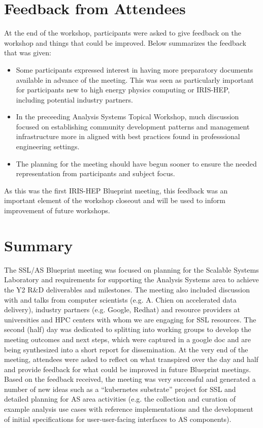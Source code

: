 \documentclass[11pt,letterpaper,fleqn]{article}
\begin{document}
\section{Feedback from Attendees}
\vspace{0.2cm}
At the end of the workshop, participants were asked to give feedback on the workshop and things that could be improved. Below summarizes the feedback that was given:
\begin{itemize}
  \item Some participants expressed interest in having more preparatory documents available in advance of the meeting.  This was seen as particularly important for participants new to high energy physics computing or IRIS-HEP, including potential industry partners.
  \item In the preceeding Analysis Systems Topical Workshop, much discussion focused on establishing community development patterns and management infrastructure more in aligned with best practices found in professsional engineering settings.
  \item The planning for the meeting should have begun sooner to ensure the needed representation from participants and subject focus.
\end{itemize}
As this was the first IRIS-HEP Blueprint meeting, this feedback was an important element of the workshop closeout and will be used to inform improvement of future workshops.

\section{Summary}
\vspace{0.2cm}
The SSL/AS Blueprint meeting was focused on planning for the Scalable Systems Laboratory and requirements for supporting the Analysis Systems area to achieve the Y2 R\&D deliverables and milestones. The meeting also included discussion with and talks from computer scientists (e.g. A. Chien on accelerated data delivery), industry partners (e.g. Google, Redhat) and resource providers at universities and HPC centers with whom we are engaging for SSL resources. The second (half) day was dedicated to splitting into working groups to develop the meeting outcomes and next steps, which were captured in a google doc and are being synthesized into a short report for dissemination. At the very end of the meeting, attendees were asked to reflect on what transpired over the day and half and provide feedback for what could be improved in future Blueprint meetings. Based on the feedback received, the meeting was very successful and generated a number of new ideas such as a “kubernetes substrate” project for SSL and detailed planning for AS area activities (e.g. the collection and curation of example analysis use cases with reference implementations and the development of initial specifications for user-user-facing interfaces to AS components).
\end{document}
